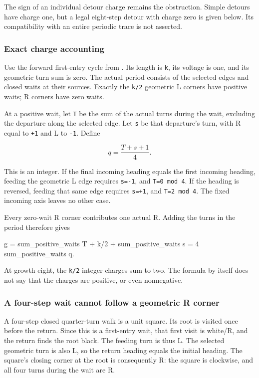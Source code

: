 \documentclass[11pt,letterpaper]{article}
\theoremstyle{plain}
\theoremstyle{definition}
\begin{document}
\begin{NoHyper}
The sign of an individual detour charge remains the obstruction. Simple detours have charge one, but a legal eight-step detour with charge zero is given below. Its compatibility with an entire periodic trace is not asserted.

\subsubsection{Exact charge accounting}

Use the forward first-entry cycle from . Its length is \texttt{k}, its voltage is one, and its geometric turn sum is zero. The actual period consists of the selected edges and closed waits at their sources. Exactly the \texttt{k/2} geometric L corners have positive waits; R corners have zero waits.

At a positive wait, let \texttt{T} be the sum of the actual turns during the wait, excluding the departure along the selected edge. Let \texttt{s} be that departure's turn, with R equal to \texttt{+1} and L to \texttt{-1}. Define

\[
q=\frac{T+s+1}{4}.
\]

This is an integer. If the final incoming heading equals the first incoming heading, feeding the geometric L edge requires \texttt{s=-1}, and \texttt{T=0\ mod\ 4}. If the heading is reversed, feeding that same edge requires \texttt{s=+1}, and \texttt{T=2\ mod\ 4}. The fixed incoming axis leaves no other case.

Every zero-wait R corner contributes one actual R. Adding the turns in the period therefore gives

\begin{codeblock}
g = sum_positive_waits T + k/2 + sum_positive_waits s
  = 4 sum_positive_waits q.
\end{codeblock}

At growth eight, the \texttt{k/2} integer charges sum to two. The formula by itself does not say that the charges are positive, or even nonnegative.

\subsubsection{A four-step wait cannot follow a geometric R corner}

A four-step closed quarter-turn walk is a unit square. Its root is visited once before the return. Since this is a first-entry wait, that first visit is white/R, and the return finds the root black. The feeding turn is thus L. The selected geometric turn is also L, so the return heading equals the initial heading. The square's closing corner at the root is consequently R: the square is clockwise, and all four turns during the wait are R.


\end{NoHyper}
\end{document}
